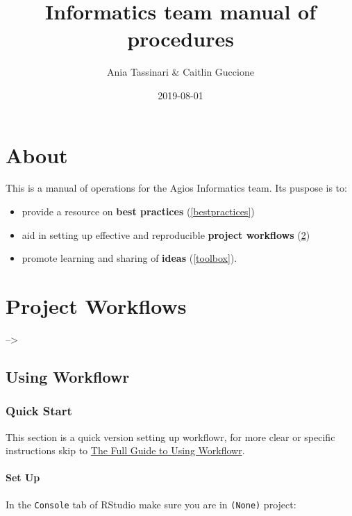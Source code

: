 \documentclass[openany]{article}
\title{Informatics team manual of procedures}
\author{Ania Tassinari \& Caitlin Guccione}
\date{2019-08-01}
\providecommand{\tightlist}{%
  \setlength{\itemsep}{0pt}\setlength{\parskip}{0pt}}
\let\oldparagraph\paragraph
\renewcommand{\paragraph}[1]{\oldparagraph{#1}\mbox{}}
\begin{document}
\maketitle

{
\hypersetup{linkcolor=black}
\setcounter{tocdepth}{2}
\tableofcontents
}
\hypertarget{about}{%
\section{About}\label{about}}

This is a manual of operations for the Agios Informatics team. Its puspose is to:

\begin{itemize}
\tightlist
\item
  provide a resource on \textbf{best practices} (\ref{bestpractices})
\item
  aid in setting up effective and reproducible \textbf{project workflows} (\ref{workflows})
\item
  promote learning and sharing of \textbf{ideas} (\ref{toolbox}).
\end{itemize}

\hypertarget{workflows}{%
\section{Project Workflows}\label{workflows}}

--\textgreater{}

\hypertarget{using-workflowr}{%
\subsection{Using Workflowr}\label{using-workflowr}}

\hypertarget{quick-start}{%
\subsubsection{Quick Start}\label{quick-start}}

This section is a quick version setting up workflowr, for more clear or specific instructions skip to \protect\hyperlink{the-full-guide-to-using-workflowr}{The Full Guide to Using Workflowr}.

\hypertarget{set-up}{%
\paragraph{Set Up}\label{set-up}}

In the \texttt{Console} tab of RStudio make sure you are in \texttt{(None)} project:
\end{document}
